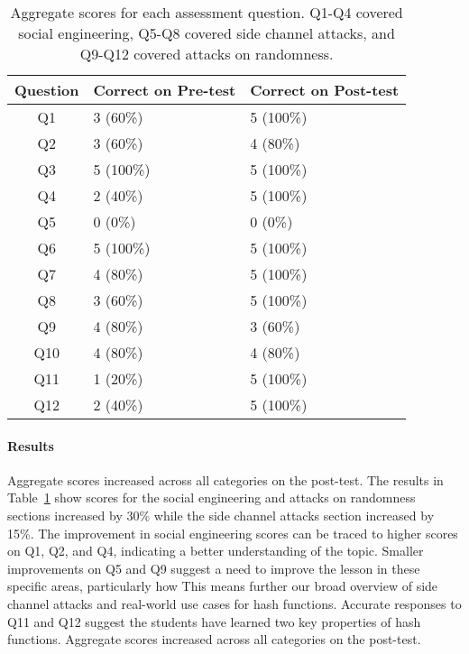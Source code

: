 \begin{table}
  \centering
  \scriptsize
  \begin{tabular}{c | l | l}
Question &  Correct on Pre-test   & Correct on Post-test \\
\hline
Q1   & 3 (60\%)  & 5 (100\%) \\
Q2   & 3 (60\%)  & 4 (80\%)  \\
Q3   & 5 (100\%) & 5 (100\%) \\
Q4   & 2 (40\%)  & 5 (100\%) \\
\hline
Q5   & 0 (0\%)   & 0 (0\%)   \\
Q6   & 5 (100\%) & 5 (100\%) \\
Q7   & 4 (80\%)  & 5 (100\%) \\
Q8   & 3 (60\%)  & 5 (100\%) \\
\hline
Q9   & 4 (80\%)  & 3 (60\%)  \\
Q10  & 4 (80\%)  & 4 (80\%)  \\
Q11  & 1 (20\%)  & 5 (100\%) \\
Q12  & 2 (40\%)  & 5 (100\%) \\
\end{tabular}

\caption{Aggregate scores for each assessment question. Q1-Q4 covered
  social engineering, Q5-Q8 covered side channel attacks, and Q9-Q12
  covered attacks on randomness.}
\label{fig:results}
\end{table}

\paragraph{Results}
Aggregate scores increased across all categories on the post-test.
The results in Table~\ref{fig:results} show scores for the social engineering and attacks on randomness sections
increased by 30\% while the side channel attacks section increased by
15\%.
The improvement in social engineering scores can be traced to
higher scores on
Q1, Q2, and Q4,
indicating a better understanding of the topic.
Smaller improvements on Q5 and Q9 suggest a need to improve the lesson in
these specific areas, particularly how This means further our broad overview of side channel attacks
and real-world use cases for hash functions.
Accurate responses to Q11 and Q12
suggest the students have learned two
key properties of hash functions.
Aggregate scores increased across all categories on the post-test.


